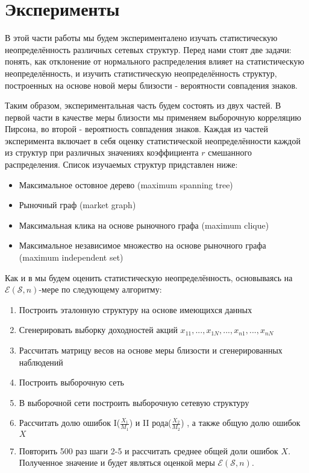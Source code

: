 \section{Эксперименты}

В этой части работы мы будем эксперименталено изучать статистическую неопределённость различных сетевых структур. Перед нами стоят две задачи: понять, как отклонение от нормального распределения влияет на статистическую неопределённость, и изучить статистическую неопределённость структур, построенных на основе новой меры близости - вероятности совпадения знаков.

Таким образом, экспериментальная часть будем состоять из двух частей. В первой части в качестве меры близости мы применяем выборочную корреляцию Пирсона, во второй - вероятность совпадения знаков. Каждая из частей эксперимента включает в себя оценку статистической неопределённости каждой из структур  при различных значениях коэффициента $r$ смешанного распределения. 
Список изучаемых структур придставлен ниже:
\begin{itemize}
	\item Максимальное остовное дерево (maximum spanning tree)
	\item Рыночный граф (market graph)
	\item Максимальная клика на основе рыночного графа (maximum clique)
	\item Максимальное независимое множество на основе рыночного графа (maximum independent set)
\end{itemize}


Как и в \cite{measures} мы будем оценить статистическую неопределённость, основываясь на $\mathcal{E}(\mathcal{S},n)$-мере по следующему алгоритму: 
\begin{enumerate}
	\item Построить эталонную структуру на основе имеющихся данных
	\item Сгенерировать выборку доходностей акций $x_{1 1}, ..., x_{1 N}, ..., x_{n 1}, ..., x_{n N}$
	\item Рассчитать матрицу весов на основе меры близости и сгенерированных наблюдений
	\item Построить выборочную сеть
	\item В выборочной сети построить выборочную сетевую структуру
	\item Рассчитать долю ошибок I($\frac{X_1}{M_1}$) и II рода($\frac{X_2}{M_2}$) , а также общую долю ошибок $X$
	\item Повторить 500 раз шаги 2-5 и рассчитать среднее общей доли ошибок $X$. Полученное значение и будет являться оценкой меры $\mathcal{E}(\mathcal{S},n)$.
\end{enumerate}

